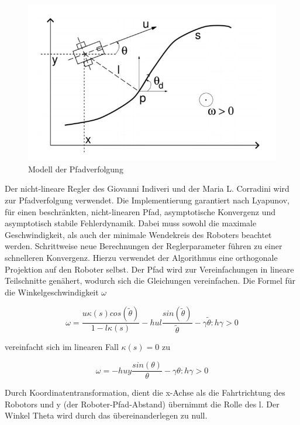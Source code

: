 \documentclass[11pt,a4paper]{article}
\begin{document}
{\begin{figure}[h]
	\includegraphics[width=\linewidth]{pictures/Pfadverfolgung.JPG}
	\caption{Modell der Pfadverfolgung}
\end{figure}

Der nicht-lineare Regler des Giovanni Indiveri und der Maria L. Corradini wird zur Pfadverfolgung verwendet. Die Implementierung garantiert nach Lyapunov, f\"ur einen beschr\"ankten, nicht-linearen Pfad, asymptotische Konvergenz und asymptotisch stabile Fehlerdynamik. Dabei muss sowohl die maximale Geschwindigkeit, als auch der minimale Wendekreis des Roboters beachtet werden. Schrittweise neue Berechnungen der Reglerparameter f\"uhren zu einer schnelleren Konvergenz. Hierzu verwendet der Algorithmus eine orthogonale Projektion auf den Roboter selbst. Der Pfad wird zur Vereinfachungen in lineare Teilschnitte gen\"ahert, wodurch sich die Gleichungen vereinfachen. Die Formel f\"ur die Winkelgeschwindigkeit $\omega$


\begin{equation}
 \omega=  \frac{u \kappa(s) cos(\tilde{\theta})}{1-l \kappa(s)}-h u l  \frac{sin(\tilde{\theta})}{\tilde{\theta}}-\gamma\tilde{\theta} :h\gamma > 0
\end{equation}

vereinfacht sich im linearen Fall $\kappa(s)=0$ zu 

\begin{equation}
\omega= -h u y  \frac{sin(\theta)}{\theta}-\gamma\theta :h\gamma > 0
\end{equation}



Durch Koordinatentransformation, dient die x-Achse als die Fahrtrichtung des Robotors  und y (der Roboter-Pfad-Abstand) \"ubernimmt die Rolle des l. Der Winkel Theta wird durch das \"ubereinanderlegen zu null.




}
\end{document}
